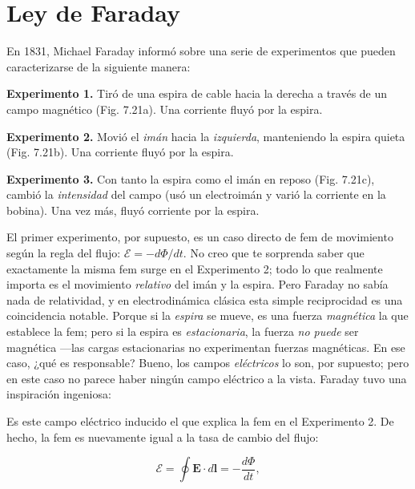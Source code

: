 \documentclass[12pt,a4paper]{report}
\newcommand{\esp}{\vspace{0.5cm}}
\begin{document}
	\section{Ley de Faraday}
	
	En 1831, Michael Faraday informó sobre una serie de experimentos que pueden caracterizarse de la siguiente manera:
	
	\textbf{Experimento 1.} Tiró de una espira de cable hacia la derecha a través de un campo magnético (Fig. 7.21a). Una corriente fluyó por la espira.
	
	\textbf{Experimento 2.} Movió el \textit{imán} hacia la \textit{izquierda}, manteniendo la espira quieta (Fig. 7.21b). Una corriente fluyó por la espira.
	
	\textbf{Experimento 3.} Con tanto la espira como el imán en reposo (Fig. 7.21c), cambió la \textit{intensidad} del campo (usó un electroimán y varió la corriente en la bobina). Una vez más, fluyó corriente por la espira.
	
	\esp
	
	El primer experimento, por supuesto, es un caso directo de fem de movimiento según la regla del flujo: $\mathcal{E} = -d\Phi/dt$. No creo que te sorprenda saber que exactamente la misma fem surge en el Experimento 2; todo lo que realmente importa es el movimiento \textit{relativo} del imán y la espira. Pero Faraday no sabía nada de relatividad, y en electrodinámica clásica esta simple reciprocidad es una coincidencia notable. Porque si la \textit{espira} se mueve, es una fuerza \textit{magnética} la que establece la fem; pero si la espira es \textit{estacionaria}, la fuerza \textit{no puede} ser magnética —las cargas estacionarias no experimentan fuerzas magnéticas. En ese caso, ¿qué es responsable? Bueno, los campos \textit{eléctricos} lo son, por supuesto; pero en este caso no parece haber ningún campo eléctrico a la vista. Faraday tuvo una inspiración ingeniosa:
	
	\esp
	
	\begin{center}
	\end{center}
	
	\esp
	
	Es este campo eléctrico inducido el que explica la fem en el Experimento 2. De hecho, la fem es nuevamente igual a la tasa de cambio del flujo:
	
	\esp
	
	\begin{equation}
		\mathcal{E} = \oint \mathbf{E} \cdot d\mathbf{l} = -\frac{d\Phi}{dt}, \tag{7.14}
	\end{equation}
	
\end{document}
